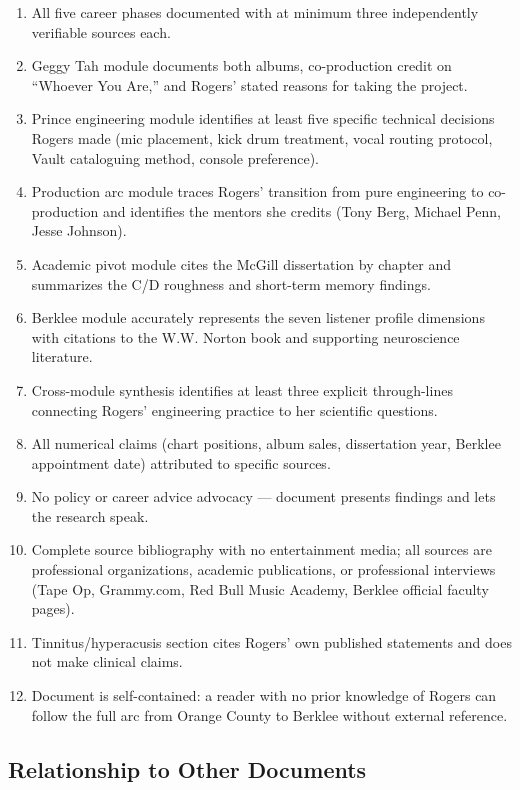 \documentclass[11pt,letterpaper]{article}
\begin{document}
\begin{enumerate}[leftmargin=2em]
  \item All five career phases documented with at minimum three independently verifiable sources each.
  \item Geggy Tah module documents both albums, co-production credit on ``Whoever You Are,'' and Rogers' stated reasons for taking the project.
  \item Prince engineering module identifies at least five specific technical decisions Rogers made (mic placement, kick drum treatment, vocal routing protocol, Vault cataloguing method, console preference).
  \item Production arc module traces Rogers' transition from pure engineering to co-production and identifies the mentors she credits (Tony Berg, Michael Penn, Jesse Johnson).
  \item Academic pivot module cites the McGill dissertation by chapter and summarizes the C/D roughness and short-term memory findings.
  \item Berklee module accurately represents the seven listener profile dimensions with citations to the W.W. Norton book and supporting neuroscience literature.
  \item Cross-module synthesis identifies at least three explicit through-lines connecting Rogers' engineering practice to her scientific questions.
  \item All numerical claims (chart positions, album sales, dissertation year, Berklee appointment date) attributed to specific sources.
  \item No policy or career advice advocacy --- document presents findings and lets the research speak.
  \item Complete source bibliography with no entertainment media; all sources are professional organizations, academic publications, or professional interviews (Tape Op, Grammy.com, Red Bull Music Academy, Berklee official faculty pages).
  \item Tinnitus/hyperacusis section cites Rogers' own published statements and does not make clinical claims.
  \item Document is self-contained: a reader with no prior knowledge of Rogers can follow the full arc from Orange County to Berklee without external reference.
\end{enumerate}

\subsection{Relationship to Other Documents}
\end{document}
